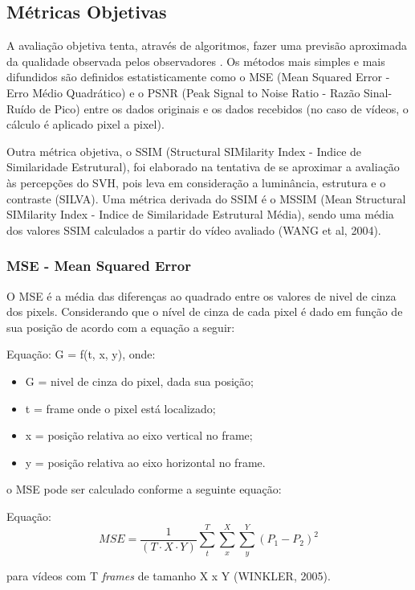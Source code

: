 \subsection{Métricas Objetivas}

A avaliação objetiva tenta, através de algoritmos, fazer uma previsão aproximada da qualidade observada pelos observadores \cite{albini}. Os métodos mais simples e mais difundidos são definidos estatisticamente como o MSE (Mean Squared Error - Erro Médio Quadrático) e o PSNR (Peak Signal to Noise Ratio - Razão Sinal-Ruído de Pico) \cite{emmersonsilva} entre os dados originais e os dados recebidos (no caso de vídeos, o cálculo é aplicado pixel a pixel).

Outra métrica objetiva, o SSIM (Structural SIMilarity Index - Indice de Similaridade Estrutural), foi elaborado na tentativa de se aproximar a avaliação às percepções do SVH, pois leva em consideração a luminância, estrutura e o contraste (SILVA). Uma métrica derivada do SSIM é o MSSIM (Mean Structural SIMilarity Index - Indice de Similaridade Estrutural Média), sendo uma média dos valores SSIM calculados a partir do vídeo avaliado (WANG et al, 2004).

\subsubsection{MSE - Mean Squared Error}

O MSE é a média das diferenças ao quadrado entre os valores de nivel de cinza dos pixels. Considerando que o nível de cinza de cada pixel é dado em função de sua posição de acordo com a equação a seguir:

Equação: G = f(t, x, y), onde:

\begin{itemize}
	\item G = nivel de cinza do pixel, dada sua posição;
	\item t = frame onde o pixel está localizado;
	\item x = posição relativa ao eixo vertical no frame;
	\item y = posição relativa ao eixo horizontal no frame.
\end{itemize}

o MSE pode ser calculado conforme a seguinte equação:

    Equação: \[MSE = \frac{1}{\left (T \cdot X \cdot Y \right )} \sum_{t}^{T} \sum_{x}^{X} \sum_{y}^{Y} \left ( P_{1} - P_{2} \right )^{2}\]

para vídeos com T \emph{frames} de tamanho X x Y (WINKLER, 2005).

